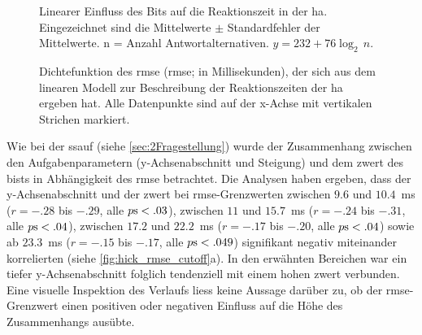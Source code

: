 \documentclass[11pt, twoside, a4paper]{book}		%
\begin{document}
\begin{figure}[t]
	\centering
	\begin{adjustbox}{width=1\textwidth}
		
	\end{adjustbox}
	\caption[Lineares Modell zur Vorhersage der Reaktionszeit durch das Bit der \gls{ha}]{Linearer Einfluss des Bits auf die Reaktionszeit in der \gls{ha}. Eingezeichnet sind die Mittelwerte $\pm$ Standardfehler der Mittelwerte. n = Anzahl Antwortalternativen. $y = 232 + 76\log_{2}\,n$.}
	\label{fig:hick_linear_model}
\end{figure}

\begin{figure}[t]
	\centering
	\begin{adjustbox}{width=1\textwidth}
		
	\end{adjustbox}
	\caption[Dichtefunktion des aus der \gls{ha} mit einer linearen Regression abgeleiteten \gls{rmse}]{Dichtefunktion des \acrlong{rmse} (\gls{rmse}; in Millisekunden), der sich aus dem linearen Modell zur Beschreibung der Reaktionszeiten der \gls{ha} ergeben hat. Alle Datenpunkte sind auf der x-Achse mit vertikalen Strichen markiert.}
	\label{fig:hick_rmse_density}
\end{figure}

Wie bei der \gls{ssauf} (siehe \autoref{sec:2Fragestellung}) wurde der Zusammenhang zwischen den Aufgabenparametern (y-Ach\-sen\-ab\-schnitt und Steigung) und dem \gls{zwert} des \gls{bist}s in Abhängigkeit des \gls{rmse} betrachtet. Die Analysen haben ergeben, dass der y-Ach\-sen\-ab\-schnitt und der \gls{zwert} bei \gls{rmse}-Grenzwerten zwischen $9.6$ und $10.4$~ms ($r = -.28$ bis $ -.29$, alle $p\textnormal{s} < .03$), zwischen $11$ und $15.7$~ms ($r = -.24$ bis $ -.31$, alle $p\textnormal{s} < .04$), zwischen $17.2$ und $22.2$~ms ($r = -.17$ bis $ -.20$, alle $p\textnormal{s} < .04$) sowie ab $23.3$~ms ($r = -.15$ bis $ -.17$, alle $p\textnormal{s} < .049$) signifikant negativ miteinander korrelierten (siehe \autoref{fig:hick_rmse_cutoff}a). In den erwähnten Bereichen war ein tiefer y-Ach\-sen\-ab\-schnitt folglich tendenziell mit einem hohen \gls{zwert} verbunden. Eine visuelle Inspektion des Verlaufs liess keine Aussage darüber zu, ob der \gls{rmse}-Grenzwert einen positiven oder negativen Einfluss auf die Höhe des Zusammenhangs ausübte.
\end{document}
